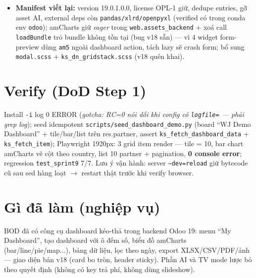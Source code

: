 \begin{itemize}
    (\texttt{@web/core/user}, đã gồm \texttt{allowed\_company\_ids});
    \texttt{useLoadFieldInfo} $\to$ \texttt{useService("field").loadFieldInfo};
    \texttt{useGetTreeDescription} $\to$ service \texttt{tree\_processor};
    \texttt{treeFromDomain/domainFromTree} đổi file; \texttt{new BlockUI()} +
    \texttt{crash\_manager} + \texttt{unblockUI} undefined $\to$ \texttt{uiService.block/unblock}
    + notification; inherit \texttt{web.UserMenu} (avatar initials, cosmetic) xpath fail
    trên navbar 19 $\to$ gỡ. Audit script quét mọi \texttt{import @web/*} đối chiếu odoo19
    source bắt unmet dependency 1 lượt.
  \item \textbf{Manifest viết lại:} version 19.0.1.0.0, license OPL-1 giữ, dedupe entries,
    gỡ asset AI, external deps còn \texttt{pandas/xlrd/openpyxl} (verified có trong conda
    env \texttt{odoo}); amCharts giữ \emph{eager} trong \texttt{web.assets\_backend} +
    xoá call \texttt{loadBundle} trỏ bundle không tồn tại (bug v18 sẵn) --- vì 4 widget
    form-preview dùng \texttt{am5} ngoài dashboard action, tách lazy sẽ crash form;
    bổ sung \texttt{modal.scss} + \texttt{ks\_dn\_gridstack.scss} (v18 quên khai).
\end{itemize}

\section{Verify (DoD Step 1)}

Install \texttt{-i} log 0 ERROR (\emph{gotcha: RC=0 nói dối khi config có
\texttt{logfile=} --- phải grep log}); seed idempotent
\texttt{scripts/seed\_dashboard\_demo.py} (board ``WJ Demo Dashboard'' + tile/bar/list
trên res.partner, assert \texttt{ks\_fetch\_dashboard\_data} + \texttt{ks\_fetch\_item});
Playwright 1920px: 3 grid item render --- tile = 10, bar chart amCharts vẽ cột theo
country, list 10 partner + pagination, \textbf{0 console error}; regression
\texttt{test\_sprint9} 7/7. Lưu ý vận hành: server \texttt{--dev=reload} giữ bytecode cũ
sau sed hàng loạt $\to$ restart thật trước khi verify browser.

\section{Gì đã làm (nghiệp vụ)}

BOD đã có công cụ dashboard kéo-thả trong backend Odoo 19: menu ``My Dashboard'', tạo
dashboard với ô đếm số, biểu đồ amCharts (bar/line/pie/map...), bảng dữ liệu, lọc theo
ngày, export XLSX/CSV/PDF/ảnh --- giao diện bản v18 (card bo tròn, header sticky).
Phần AI và TV mode lược bỏ theo quyết định (không có key trả phí, không dùng slideshow).

